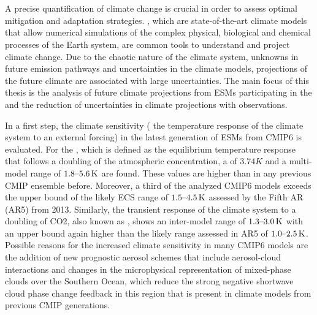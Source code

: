 
%



\chapter{\abstractname}

A precise quantification of climate change is crucial in order to assess
optimal mitigation and adaptation strategies. , which are
state-of-the-art climate models that allow numerical simulations of the complex
physical, biological and chemical processes of the Earth system, are common
tools to understand and project climate change. Due to the chaotic nature of
the climate system, unknowns in future emission pathways and uncertainties in
the climate models, projections of the future climate are associated with large
uncertainties. The main focus of this thesis is the analysis of future climate
projections from \acsp{ESM} participating in the  and the
reduction of uncertainties in climate projections with observations.

In a first step, the climate sensitivity (\ie{} the temperature response of the
climate system to an external forcing) in the latest generation of \acsp{ESM}
from \acs{CMIP}6 is evaluated. For the , which is defined as
the equilibrium temperature response that follows a doubling of the atmospheric
 concentration, a  of $3.74 \unit{K}$ and a
multi-model range of $\rangeunit{1.8}{5.6}{K}$ are found. These values are
higher than in any previous \acs{CMIP} ensemble before. Moreover, a third of
the analyzed \acs{CMIP}6 models exceeds the upper bound of the likely \acs{ECS}
range of $\rangeunit{1.5}{4.5}{K}$ assessed by the  Fifth
\acl{AR} (\acs{AR}5) from 2013. Similarly, the transient response of the
climate system to a doubling of \acs{CO2}, also known as ,
shows an inter-model range of $\rangeunit{1.3}{3.0}{K}$ with an upper bound
again higher than the likely range assessed in \acs{AR}5 of
$\rangeunit{1.0}{2.5}{K}$. Possible reasons for the increased climate
sensitivity in many \acs{CMIP}6 models are the addition of new prognostic
aerosol schemes that include aerosol-cloud interactions and changes in the
microphysical representation of mixed-phase clouds over the Southern Ocean,
which reduce the strong negative shortwave cloud phase change feedback in this
region that is present in climate models from previous \acs{CMIP} generations.

